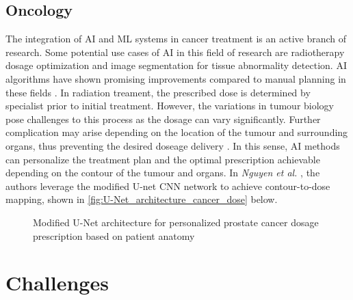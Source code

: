 \documentclass[a4paper]{article}
\begin{document}
\subsection{Oncology}
The integration of AI and ML systems in cancer treatment is an active branch of research.
Some potential use cases of AI in this field of research are radiotherapy dosage optimization and image segmentation for tissue abnormality detection. AI algorithms have shown promising improvements compared to manual planning in these fields \cite{thompson_artificial_2018}.
In radiation treament, the prescribed dose is determined by specialist prior to initial treatment. However, the variations in tumour biology pose challenges to this process as the dosage can vary significantly. Further complication may arise depending on the location of the tumour and surrounding organs, thus preventing the desired doseage delivery \cite{huynh_artificial_2020}. In this sense, AI methods can personalize the treatment plan and the optimal prescription achievable depending on the contour of the tumour and organs.
In \textit{Nguyen et al.} \cite{nguyen_feasibility_2019}, the authors leverage the modified U-net CNN network to achieve contour-to-dose mapping, shown in \autoref{fig:U-Net_architecture_cancer_dose} below.
\begin{figure}[htbp]
    \caption{Modified U-Net architecture for personalized prostate cancer dosage prescription based on patient anatomy}
    \label{fig:U-Net_architecture_cancer_dose}
\end{figure}

\section{Challenges}
\end{document}
